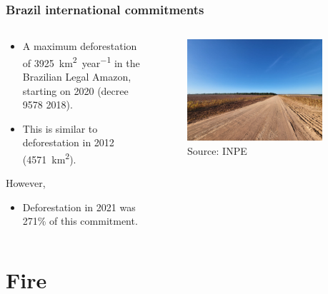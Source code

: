 \documentclass[aspectratio=169]{beamer}
\begin{document}
\begin{frame}
  \frametitle{Brazil international commitments}
  \begin{columns}
    \begin{column}{0.4\textwidth}
      \begin{itemize}
        \item A maximum deforestation of 3925~\si{\km^{2}\per year} in 
          the Brazilian Legal Amazon, starting on 2020 (decree 9578 2018).
        \item This is similar to deforestation in 2012 (4571~\si{\km^{2}}).
      \end{itemize}
      However,
      \begin{itemize}
        \item Deforestation in 2021 was 271\% of this commitment.
      \end{itemize}
    \end{column}
    \begin{column}{0.6\textwidth}
      \begin{figure}
        \centering
        \includegraphics[width=0.9\textwidth]{img/planted_field.png}
        \caption{Source: INPE}
        \label{fig:planted_field}
      \end{figure}
    \end{column}
  \end{columns}
\end{frame}


\section{Fire}
\end{document}
